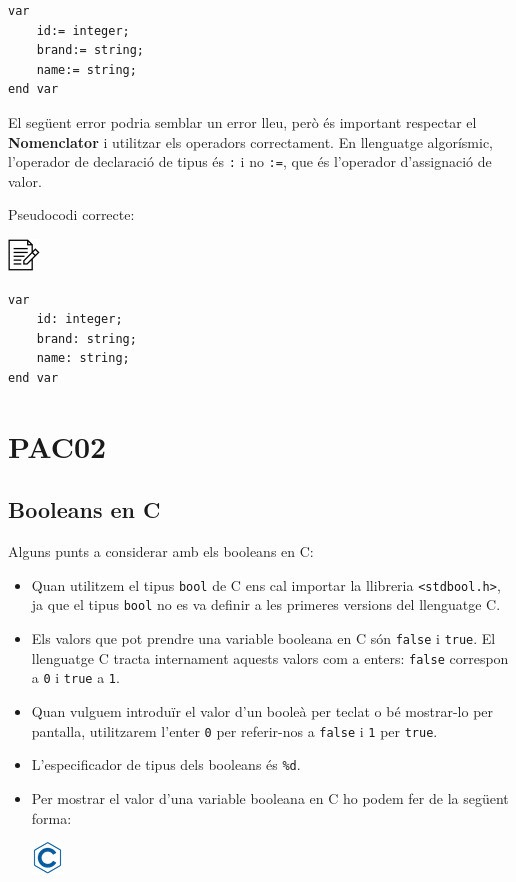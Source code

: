 \documentclass[
]{book}
\providecommand{\tightlist}{%
  \setlength{\itemsep}{0pt}\setlength{\parskip}{0pt}}
\begin{document}
\begin{verbatim}
var
    id:= integer;
    brand:= string;
    name:= string;
end var
\end{verbatim}

El següent error podria semblar un error lleu, però és important respectar el \textbf{Nomenclator} i utilitzar els operadors correctament. En llenguatge algorísmic, l'operador de declaració de tipus és \texttt{:} i no \texttt{:=}, que és l'operador d'assignació de valor.

Pseudocodi correcte:

\includegraphics{./img/alg.png}

\begin{verbatim}
var
    id: integer;
    brand: string;
    name: string;
end var
\end{verbatim}

\hypertarget{pac02}{%
\chapter{PAC02}\label{pac02}}

\hypertarget{booleans-en-c}{%
\section{Booleans en C}\label{booleans-en-c}}

Alguns punts a considerar amb els booleans en C:

\begin{itemize}
\tightlist
\item
  Quan utilitzem el tipus \texttt{bool} de C ens cal importar la llibreria \texttt{\textless{}stdbool.h\textgreater{}}, ja que el tipus \texttt{bool} no es va definir a les primeres versions del llenguatge C.
\item
  Els valors que pot prendre una variable booleana en C són \texttt{false} i \texttt{true}. El llenguatge C tracta internament aquests valors com a enters: \texttt{false} correspon a \texttt{0} i \texttt{true} a \texttt{1}.
\item
  Quan vulguem introduïr el valor d'un booleà per teclat o bé mostrar-lo per pantalla, utilitzarem l'enter \texttt{0} per referir-nos a \texttt{false} i \texttt{1} per \texttt{true}.
\item
  L'especificador de tipus dels booleans és \texttt{\%d}.
\item
  Per mostrar el valor d'una variable booleana en C ho podem fer de la següent forma:

  \includegraphics{./img/c.png}
\end{itemize}
\end{document}

